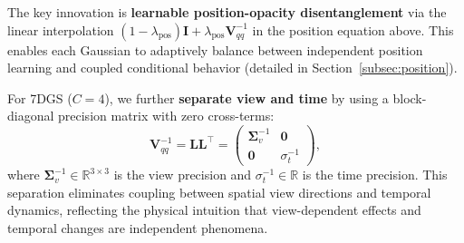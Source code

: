 \documentclass{article}
\newcommand{\modelname}{\textit{d}GS}
\begin{document}
The key innovation is \textbf{learnable position-opacity disentanglement} via the linear interpolation $(1-\lambda_\text{pos}) \mathbf{I} + \lambda_\text{pos} \mathbf{V}_{qq}^{-1}$ in the position equation above. This enables each Gaussian to adaptively balance between independent position learning and coupled conditional behavior (detailed in Section~\ref{subsec:position}).

For 7DGS ($C=4$), we further \textbf{separate view and time} by using a block-diagonal precision matrix with zero cross-terms:
\begin{equation}
\mathbf{V}_{qq}^{-1} = \mathbf{L}\mathbf{L}^\top = \begin{pmatrix}
\mathbf{\Sigma}_v^{-1} & \mathbf{0} \\
\mathbf{0} & \sigma_t^{-1}
\end{pmatrix},
\end{equation}
where $\mathbf{\Sigma}_v^{-1} \in \mathbb{R}^{3 \times 3}$ is the view precision and $\sigma_t^{-1} \in \mathbb{R}$ is the time precision. This separation eliminates coupling between spatial view directions and temporal dynamics, reflecting the physical intuition that view-dependent effects and temporal changes are independent phenomena.

\begin{table}[t!]
\centering
\caption{Disentangled conditioning in \modelname{} vs. entangled covariance in N-DGS. Each component in \modelname{} is parameterized independently, eliminating the need for full covariance modeling.}
\label{tab:comparison_overview}
\end{table}
\end{document}
